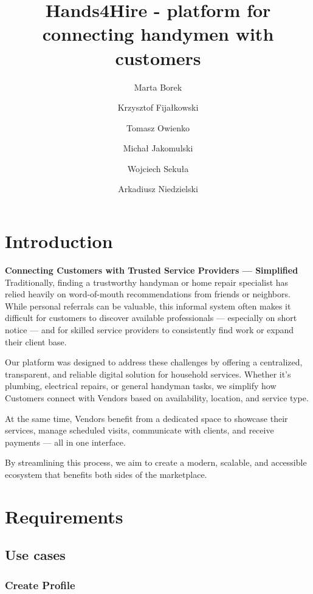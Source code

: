 \documentclass[11pt,a4paper]{article}
\title{Hands4Hire - platform for connecting handymen with customers}
\author{Marta Borek \and Krzysztof Fijałkowski \and Tomasz Owienko
\and Michał Jakomulski \and Wojciech Sekuła \and Arkadiusz Niedzielski}
\date{}
\begin{document}

\maketitle

\setcounter{tocdepth}{2}
\tableofcontents
\newpage

\section{Introduction}
\textbf{Connecting Customers with Trusted Service Providers --- Simplified} \\

Traditionally, finding a trustworthy handyman or home repair specialist has relied heavily on word-of-mouth recommendations from friends or neighbors. While personal referrals can be valuable, this informal system often makes it difficult for customers to discover available professionals — especially on short notice — and for skilled service providers to consistently find work or expand their client base.

Our platform was designed to address these challenges by offering a centralized, transparent, and reliable digital solution for household services. Whether it’s plumbing, electrical repairs, or general handyman tasks, we simplify how Customers connect with Vendors based on availability, location, and service type.

At the same time, Vendors benefit from a dedicated space to showcase their services, manage scheduled visits, communicate with clients, and receive payments — all in one interface.

By streamlining this process, we aim to create a modern, scalable, and accessible ecosystem that benefits both sides of the marketplace.

\section{Requirements}

\subsection{Use cases}

\subsubsection{Create Profile}
\end{document}
